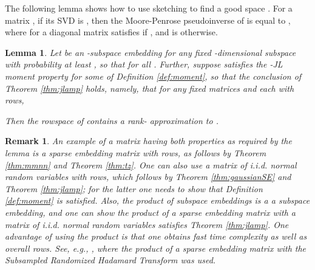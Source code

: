 \documentclass[11pt]{article}
\newtheorem{lemma}[theorem]{Lemma}
\newtheorem{remark}[theorem]{Remark}
\begin{document}
The following lemma shows how to use sketching to find a good space . For a matrix
, if its SVD is , then the Moore-Penrose pseudoinverse  of 
is equal to , where  for a diagonal matrix 
satisfies  if , and is  otherwise. 
\begin{lemma}\label{lem:sketching}
Let  be an -subspace embedding for any fixed -dimensional subspace  
with probability at least , so that
 for all . Further, suppose  satisfies
the -JL moment property for some  of Definition \ref{def:moment}, so
that the conclusion of Theorem \ref{thm:jlamp} holds, namely, that for any fixed matrices  and  each with 
 rows, 

Then the rowspace of  contains a  rank- approximation to . 
\end{lemma}
\begin{remark}
An example of a matrix  having both properties as required by the lemma 
is a sparse embedding matrix with
 rows, as follows by Theorem \ref{thm:mmnn} and Theorem \ref{thm:tz}. One
can also use a matrix  of i.i.d. normal random variables with  rows, 
which follows by Theorem
\ref{thm:gaussianSE} and Theorem \ref{thm:jlamp}; for the latter one needs to show that Definition
\ref{def:moment} is satisfied. Also, the product of subspace embeddings is a 
a subspace embedding, and one can show the product of a sparse embedding matrix with
a matrix of i.i.d. normal random variables satisfies Theorem \ref{thm:jlamp}. One advantage of
using the product is that one obtains fast time complexity as well as  overall rows.
See, e.g., \cite{CW13}, where the product of a sparse embedding matrix with the Subsampled
Randomized Hadamard Transform was used. 
\end{remark}
\end{document}

